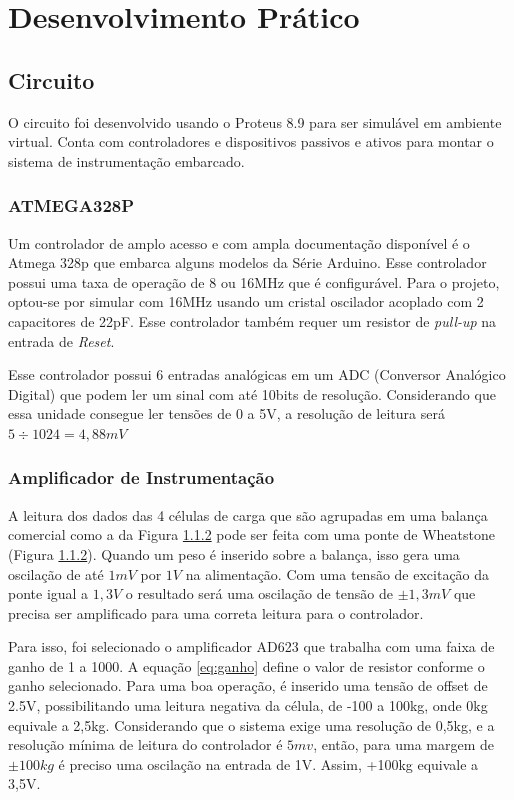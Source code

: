 \documentclass[a4paper, 12pt]{article}
\begin{document}
	
	\section{Desenvolvimento Prático}
	
	\subsection{Circuito}
	O circuito foi desenvolvido usando o Proteus 8.9 para ser simulável em ambiente virtual. Conta com controladores e dispositivos passivos e ativos para montar o sistema de instrumentação embarcado.  
	
	\subsubsection{ATMEGA328P}
	Um controlador de amplo acesso e com ampla documentação disponível é o Atmega 328p que embarca alguns modelos da Série Arduino. Esse controlador possui uma taxa de operação de 8 ou 16MHz que é configurável. Para o projeto, optou-se por simular com 16MHz usando um cristal oscilador acoplado com 2 capacitores de 22pF. Esse controlador também requer um resistor  de \textit{pull-up} na entrada de \textit{Reset}.
	
	Esse controlador possui 6 entradas analógicas em um ADC (Conversor Analógico Digital) que podem ler um sinal com até 10bits de resolução. Considerando que essa unidade consegue ler tensões de 0 a 5V, a resolução de leitura será $ 5\div 1024 = 4,88mV  $
	
	\subsubsection{Amplificador de Instrumentação}
	A leitura dos dados das 4 células de carga que são agrupadas em uma balança comercial como a da Figura \ref{} pode ser feita com uma ponte de Wheatstone (Figura \ref{}). Quando um peso é inserido sobre a balança, isso gera uma oscilação de até $ 1mV $ por $ 1V $ na alimentação. Com uma tensão de excitação da ponte igual a $ 1,3V $ o resultado será uma oscilação de tensão de $ \pm 1,3mV $ que precisa ser amplificado para uma correta leitura para o controlador. 
	
	Para isso, foi selecionado o amplificador AD623 que trabalha com uma faixa de ganho de 1 a 1000. A equação \ref{eq:ganho} define o valor de resistor conforme o ganho selecionado. Para uma boa operação, é inserido uma tensão de offset de 2.5V, possibilitando uma leitura negativa da célula, de -100 a 100kg, onde 0kg equivale a 2,5kg. Considerando que o sistema exige uma resolução de 0,5kg, e a resolução mínima de leitura do controlador é $ 5mv $, então, para uma margem de $ \pm100kg $ é preciso uma oscilação na entrada de 1V. Assim, +100kg equivale a 3,5V.
	
\end{document}
